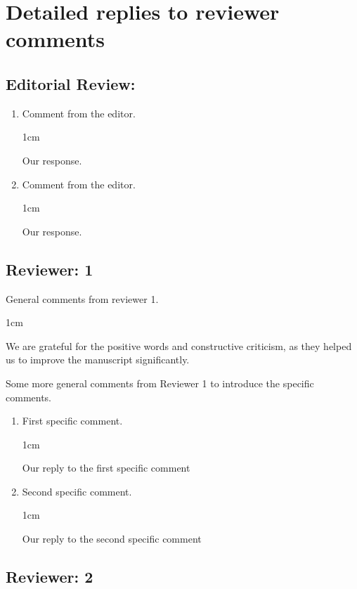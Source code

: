 \documentclass[rightcolwidth=.38]{ugent-note}
\newenvironment{reply}{%
    \begin{adjustwidth}{1cm}{}
    \color{ugentblue}%
}{%
    \end{adjustwidth}
}
\begin{document}
\section*{Detailed replies to reviewer comments}

\subsection*{Editorial Review:}

\begin{enumerate}
    \item
    Comment from the editor.
    \begin{reply}
        Our response.
    \end{reply}

    \item
    Comment from the editor.
    \begin{reply}
        Our response.
    \end{reply}
\end{enumerate}


\subsection*{Reviewer: 1}

General comments from reviewer 1.

\begin{reply}
    We are grateful for the positive words and constructive criticism, as they helped us to improve the manuscript significantly.
\end{reply}

Some more general comments from Reviewer 1 to introduce the specific comments.

\begin{enumerate}[parsep=0.5em]
    \item First specific comment.
    \begin{reply}
        Our reply to the first specific comment
    \end{reply}

    \item Second specific comment.
    \begin{reply}
        Our reply to the second specific comment
    \end{reply}
\end{enumerate}

\subsection*{Reviewer: 2}
\end{document}
